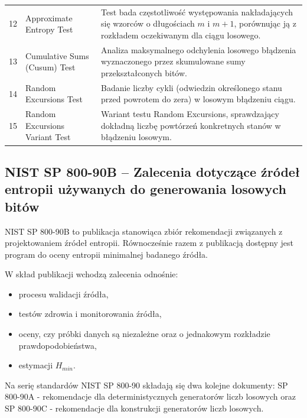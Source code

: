 \begin{table}[htbp]
\begin{tabularx}{\textwidth}{lX p{9.5cm}}
12 & Approximate Entropy Test & Test bada częstotliwość występowania nakładających się wzorców o długościach $m$ i $m+1$, porównując ją z rozkładem oczekiwanym dla ciągu losowego. \\
13 & Cumulative Sums (Cusum) Test & Analiza maksymalnego odchylenia losowego błądzenia wyznaczonego przez skumulowane sumy przekształconych bitów. \\
14 & Random Excursions Test & Badanie liczby cykli (odwiedzin określonego stanu przed powrotem do zera) w losowym błądzeniu ciągu. \\
15 & Random Excursions Variant Test & Wariant testu Random Excursions, sprawdzający dokładną liczbę powtórzeń konkretnych stanów w błądzeniu losowym. \\
\bottomrule
\end{tabularx}
\end{table}



\subsection{NIST SP 800-90B -- Zalecenia dotyczące źródeł entropii
używanych do generowania losowych bitów}

\noindent NIST SP 800-90B to publikacja stanowiąca zbiór 
rekomendacji związanych z projektowaniem źródeł entropii. Równocześnie razem z 
publikacją dostępny jest program do oceny entropii minimalnej badanego źródła. 

W skład publikacji wchodzą zalecenia odnośnie: 

\begin{itemize}
    \item procesu walidacji źródła,
    \item testów zdrowia i monitorowania źródła,
    \item oceny, czy próbki danych są niezależne oraz o jednakowym rozkładzie 
    prawdopodobieństwa,
    \item estymacji $H_{min}$.
\end{itemize}

Na serię standardów NIST SP 800-90 składają się dwa kolejne dokumenty: SP 800-90A - rekomendacje 
dla deterministycznych generatorów liczb losowych oraz SP 800-90C - rekomendacje 
dla konstrukcji generatorów liczb losowych.
